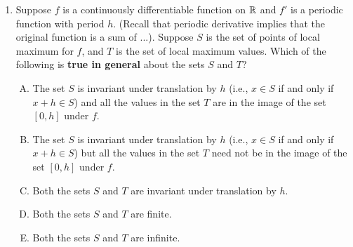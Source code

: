 \documentclass[10pt]{amsart}
\begin{document}
\begin{enumerate}
  {\em Answer}: Option (B).

  {\em Explanation}: Since $f$ is continuous, being non-increasing on
  $(c - \delta, c)$ implies being non-increasing on $(c -
  \delta,c]$. Similarly on the right side. In particular, this means
  that $f(c) \le f(x)$ for all $x \in (c - \delta, c + \delta)$,
  establishing $c$ as a point of local minimum.

  {\em The other choices}: Options (C) and (D) have the wrong kind of
  increase/decrease. Option (A) is wrong, though counterexamples are
  hard to come by. The reason Option (A) is wrong is the core of the
  reason that the first-derivative test does not always work: the
  function could be oscillatory very close to the point $c$, so that
  even though $c$ is a point of local minimum, the function does not
  steadily become non-increasing to the left of $c$. The example
  discussed in the lecture notes is $|x|(2 + \sin(1/x))$.

  {\em Performance review}: $2$ out of $11$ got this. $6$ chose (A)
  and $1$ each chose (C), (D), and (E).

  {\em Historical note (last year)}: $5$ people got this correct. $5$
  people chose (A), which is the converse of the statement. $2$ people
  chose (D) and $1$ person each chose (C) and (E). Thus, most people
  got the sign/direction part correct but messed up on which way the
  implication goes.

  {\em Action point}: This is tricky to get when the lecture material
  is still very new to you. However, you should consistently get this
  kind of question correct once you have reviewed and mastered the
  lecture material.
\item Suppose $f$ is a continuously differentiable function on $\mathbb{R}$
  and $f'$ is a periodic function with period $h$. (Recall that
  periodic derivative implies that the original function is a sum of
  ...). Suppose $S$ is the set of points of local maximum for $f$, and
  $T$ is the set of local maximum values. Which of the following is
  {\bf true in general} about the sets $S$ and $T$?

  \begin{enumerate}[(A)]
  \item The set $S$ is invariant under translation by $h$ (i.e., $x
    \in S$ if and only if $x + h \in S$) and all the values in the set
    $T$ are in the image of the set $[0,h]$ under $f$.
  \item The set $S$ is invariant under translation by $h$ (i.e., $x
    \in S$ if and only if $x + h \in S$) but all the values in the set
    $T$ need not be in the image of the set $[0,h]$ under $f$.
  \item Both the sets $S$ and $T$ are invariant under translation by $h$.
  \item Both the sets $S$ and $T$ are finite.
  \item Both the sets $S$ and $T$ are infinite.
  \end{enumerate}


\end{enumerate}
\end{document}
